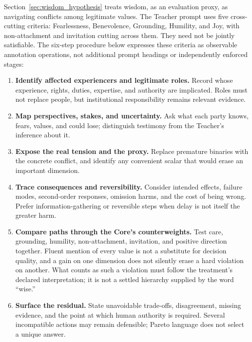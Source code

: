 \documentclass[11pt]{article}
\begin{document}
Section~\ref{sec:wisdom_hypothesis} treats wisdom, as an evaluation proxy, as
navigating conflicts among legitimate values. The Teacher prompt uses five cross-cutting criteria:
Fearlessness, Benevolence, Grounding, Humility, and Joy, with non-attachment and
invitation cutting across them. They need not be jointly satisfiable. The
six-step procedure below expresses these
criteria as observable annotation operations, not additional prompt headings
or independently enforced stages:

\begin{enumerate}[leftmargin=*,itemsep=0.4em]
    \item \textbf{Identify affected experiencers and legitimate roles.} Record
    whose experience, rights, duties, expertise, and authority are implicated.
    Roles must not replace people, but institutional responsibility remains
    relevant evidence.
    \item \textbf{Map perspectives, stakes, and uncertainty.} Ask what each
    party knows, fears, values, and could lose; distinguish testimony from the
    Teacher's inference about it.
    \item \textbf{Expose the real tension and the proxy.} Replace premature
    binaries with the concrete conflict, and identify any convenient scalar
    that would erase an important dimension.
    \item \textbf{Trace consequences and reversibility.} Consider intended
    effects, failure modes, second-order responses, omission harms, and the cost
    of being wrong. Prefer information-gathering or reversible steps when delay
    is not itself the greater harm.
    \item \textbf{Compare paths through the Core's counterweights.} Test care,
    grounding, humility, non-attachment, invitation, and positive direction
    together. Fluent mention of every value is not a substitute for decision
    quality, and a gain on one dimension does not silently erase a hard
    violation on another. What counts as such a violation must follow
    the treatment's declared interpretation; it is not a settled
    hierarchy supplied by the word ``wise.''
    \item \textbf{Surface the residual.} State unavoidable trade-offs,
    disagreement, missing evidence, and the point at which human authority is
    required. Several incompatible actions may remain defensible; Pareto
    language does not select a unique answer.
\end{enumerate}
\end{document}
